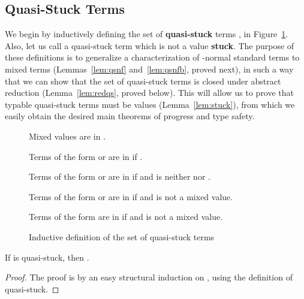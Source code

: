 \documentclass{LMCS}
\begin{document}
\subsection{Quasi-Stuck Terms}

We begin by inductively defining the set of \textbf{quasi-stuck} terms
, in Figure~\ref{fig:qs}.  Also, let us call a quasi-stuck term
which is not a value \textbf{stuck}.  The purpose of these definitions
is to generalize a characterization of -normal standard terms to
mixed terms (Lemmas~\ref{lem:qsnf} and~\ref{lem:qsnfb}, proved next),
in such a way that we can show that the set of quasi-stuck terms is
closed under abstract reduction (Lemma~\ref{lem:redqs}, proved below).
This will allow us to prove that typable quasi-stuck terms must be
values (Lemma~\ref{lem:stuck}), from which we easily obtain the
desired main theorems of progress and type safety.

\begin{figure}[b]
\begin{iteMize}{}
\item Mixed values  are in .
\item Terms of the form  or  are in  if .
\item Terms of the form  or  are in  if  and  is neither  nor .
\item Terms of the form  or  are in  if  and  is not a mixed value.
\item Terms of the form  are in  if  and  is not a mixed value.
\end{iteMize}
\caption{Inductive definition of the set  of quasi-stuck terms}
\label{fig:qs}
\end{figure}

\begin{lem}
\label{lem:qsnf}
If  is quasi-stuck, then .
\end{lem}
\begin{proof} The proof is by an easy structural induction on , 
using the definition of quasi-stuck. 
\end{proof}
\end{document}

